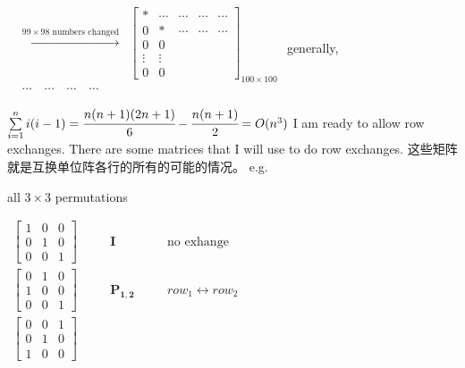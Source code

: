 \documentclass[12pt, a4paper]{article}
\begin{document}
{\begin{math}
\begin{aligned}
		&\xrightarrow{99 \times 98 {\text{ numbers changed}}}&
		\begin{bmatrix}
			* & \cdots & \cdots & \cdots & \cdots \\
			0 & * & \cdots & \cdots & \cdots \\
			0 & 0 & \ & \ & \ \\
			\vdots & \vdots & \ & \ & \ \\
			0 & 0 & \ & \ & \ 
		\end{bmatrix}_{100 \times 100}
		\\
		&\cdots \quad \cdots \quad \cdots \quad \cdots&
	\end{aligned}
\end{math}
\newline
generally, 
\par 
\begin{math}
	\sum\limits_{i=1}^{n}i(i-1) = \cfrac{n(n+1)(2n+1)}{6} - \cfrac{n(n+1)}{2} = O(n^3)
\end{math}
\vspace{14pt}
\newline
I am ready to allow row exchanges.
\vspace{14pt}
\newline
There are some matrices that I will use to do row exchanges.
\newline 这些矩阵就是互换单位阵各行的所有的可能的情况。
\newline
e.g. 
\par all $3 \times 3$ permutations 
\par 
\begin{math}
	\begin{aligned}
		\begin{bmatrix}
			1 & 0 & 0 \\
			0 & 1 & 0 \\
			0 & 0 & 1
		\end{bmatrix}
		& \quad & {\mathbf{I}} & \quad & {\text{no exhange}} \\
		\begin{bmatrix}
			0 & 1 & 0 \\
			1 & 0 & 0 \\
			0 & 0 & 1
		\end{bmatrix}
		& \quad & {\mathbf{P_{1,2}}} & \quad & row_1 \leftrightarrow row_2 \\
		\begin{bmatrix}
			0 & 0 & 1 \\
			0 & 1 & 0 \\
			1 & 0 & 0
		\end{bmatrix}

\end{aligned}
\end{math}}
\end{document}
